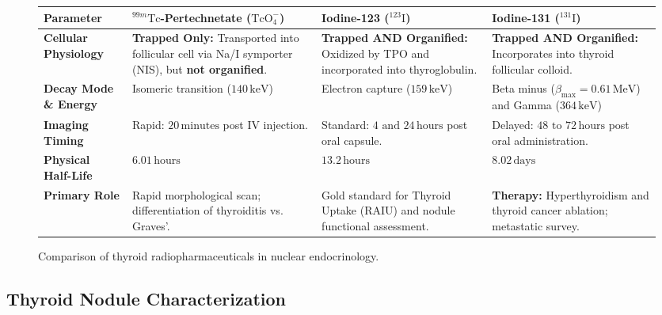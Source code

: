 \documentclass[11pt,a4paper]{article}
\begin{document}
\begin{figure}[htbp]
\centering
\setlength{\tabcolsep}{4pt}
\begin{tabular}{p{3.2cm}p{3.6cm}p{3.8cm}p{3.8cm}}
\toprule
\textbf{Parameter} & \textbf{$^{99m}\text{Tc}$-Pertechnetate ($\text{TcO}_4^-$)} & \textbf{Iodine-123 ($^{123}\text{I}$)} & \textbf{Iodine-131 ($^{131}\text{I}$)} \\
\midrule
\textbf{Cellular Physiology} & \textbf{Trapped Only:} Transported into follicular cell via Na/I symporter (NIS), but \textbf{not organified}. & \textbf{Trapped AND Organified:} Oxidized by TPO and incorporated into thyroglobulin. & \textbf{Trapped AND Organified:} Incorporates into thyroid follicular colloid. \\
\addlinespace
\textbf{Decay Mode \& Energy} & Isomeric transition ($140\,\text{keV}$) & Electron capture ($159\,\text{keV}$) & Beta minus ($\beta_{\text{max}} = 0.61\,\text{MeV}$) and Gamma ($364\,\text{keV}$) \\
\addlinespace
\textbf{Imaging Timing} & Rapid: $20\,\text{minutes}$ post IV injection. & Standard: $4\text{ and }24\,\text{hours}$ post oral capsule. & Delayed: $48\text{ to }72\,\text{hours}$ post oral administration. \\
\addlinespace
\textbf{Physical Half-Life} & $6.01\,\text{hours}$ & $13.2\,\text{hours}$ & $8.02\,\text{days}$ \\
\addlinespace
\textbf{Primary Role} & Rapid morphological scan; differentiation of thyroiditis vs. Graves'. & Gold standard for Thyroid Uptake (RAIU) and nodule functional assessment. & \textbf{Therapy:} Hyperthyroidism and thyroid cancer ablation; metastatic survey. \\
\bottomrule
\end{tabular}
\caption{Comparison of thyroid radiopharmaceuticals in nuclear endocrinology.}
\label{tab:thyroid_agents}
\end{figure}

\subsection{Thyroid Nodule Characterization}
\end{document}
